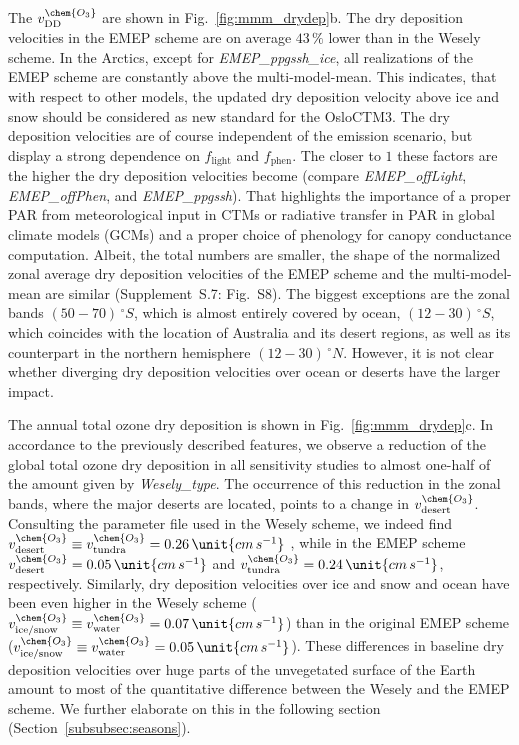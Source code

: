 \documentclass[gmd, manuscript]{copernicus}
\begin{document}
The $v^\chem{O_3}_\text{DD}$ are shown in Fig.~\ref{fig:mmm_drydep}b. The dry deposition velocities in the EMEP scheme are on average $43\,\unit{\%}$ lower than in the Wesely scheme. In the Arctics, except for \emph{EMEP\_ppgssh\_ice}, all realizations of the EMEP scheme are constantly above the multi-model-mean. This indicates, that with respect to other models, the updated dry deposition velocity above ice and snow should be considered as new standard for the OsloCTM3. The dry deposition velocities are of course independent of the emission scenario, but display a strong dependence on $f_\text{light}$ and $f_\text{phen}$. The closer to $1$ these factors are the higher the dry deposition velocities become (compare \emph{EMEP\_offLight}, \emph{EMEP\_offPhen}, and \emph{EMEP\_ppgssh}). That highlights the importance of a proper PAR from meteorological input in CTMs or radiative transfer in PAR in global climate models (GCMs) and a proper choice of phenology for canopy conductance computation. Albeit, the total numbers are smaller, the shape of the normalized zonal average dry deposition velocities of the EMEP scheme and the multi-model-mean are similar (Supplement~S.7: Fig.~S8). The biggest exceptions are the zonal bands $(50-70)\,\unit{^\circ S}$, which is almost entirely covered by ocean, $(12-30)\,\unit{^\circ S}$, which coincides with the location of Australia and its desert regions, as well as its counterpart in the northern hemisphere $(12-30)\,\unit{^\circ N}$. However, it is not clear whether diverging dry deposition velocities over ocean or deserts have the larger impact.

The annual total ozone dry deposition is shown in Fig.~\ref{fig:mmm_drydep}c. In accordance to the previously described features, we observe a reduction of the global total ozone dry deposition in all sensitivity studies to almost one-half of the amount given by \emph{Wesely\_type}. The occurrence of this reduction in the zonal bands, where the major deserts are located, points to a change in $v_\text{desert}^\chem{O_3}$. Consulting the parameter file used in the Wesely scheme, we indeed find $v_\text{desert}^\chem{O_3} \equiv v_\text{tundra}^\chem{O_3} = 0.26\,\unit{cm\,s^{-1}}$ \citep{JGR:Hough1991}, while in the EMEP scheme $v_\text{desert}^\chem{O_3}=0.05\,\unit{cm\,s^{-1}}$ and $v^\chem{O_3}_\text{tundra} = 0.24\,\unit{cm\,s^{-1}}$, respectively. Similarly, dry deposition velocities over ice and snow and ocean have been even higher in the Wesely scheme ($v_\text{ice/snow}^\chem{O_3}\equiv v_\text{water}^\chem{O_3}=0.07\,\unit{cm\,s^{-1}}$) than in the original EMEP scheme ($v_\text{ice/snow}^\chem{O_3}\equiv v_\text{water}^\chem{O_3}=0.05\,\unit{cm\,s^{-1}}$). These differences in baseline dry deposition velocities over huge parts of the unvegetated surface of the Earth amount to most of the quantitative difference between the Wesely and the EMEP scheme. We further elaborate on this in the following section (Section~\ref{subsubsec:seasons}).
\end{document}

